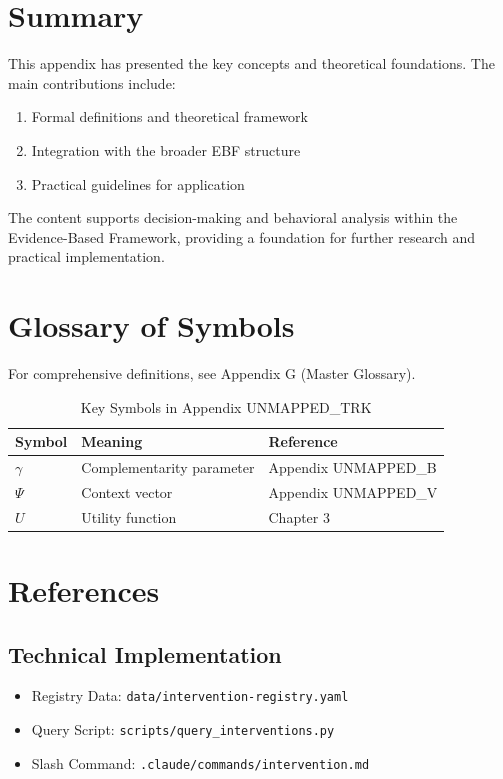 \section{Summary}
\label{sec:trk-summary}

This appendix has presented the key concepts and theoretical foundations.
The main contributions include:

\begin{enumerate}
    \item Formal definitions and theoretical framework
    \item Integration with the broader EBF structure
    \item Practical guidelines for application
\end{enumerate}

The content supports decision-making and behavioral analysis within the
Evidence-Based Framework, providing a foundation for further research
and practical implementation.


\section{Glossary of Symbols}
\label{sec:trk-glossary}

For comprehensive definitions, see Appendix G (Master Glossary).

\begin{table}[htbp]
\centering
\caption{Key Symbols in Appendix UNMAPPED_TRK}
\begin{tabular}{lll}
\toprule
\textbf{Symbol} & \textbf{Meaning} & \textbf{Reference} \\
\midrule
$\gamma$ & Complementarity parameter & Appendix UNMAPPED_B \\
$\Psi$ & Context vector & Appendix UNMAPPED_V \\
$U$ & Utility function & Chapter 3 \\
\bottomrule
\end{tabular}
\end{table}


\section{References}

\subsection{Technical Implementation}
\begin{itemize}
    \item Registry Data: \texttt{data/intervention-registry.yaml}
    \item Query Script: \texttt{scripts/query\_interventions.py}
    \item Slash Command: \texttt{.claude/commands/intervention.md}
\end{itemize}


